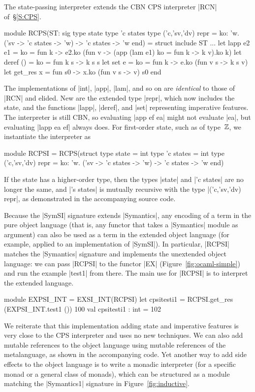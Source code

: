 The state-passing interpreter extends the CBN CPS
interpreter |RCN| of~\S\ref{S:CPS}.
\begin{code}
module RCPS(ST: sig 
  type state 
  type 'c states 
  type ('c,'sv,'dv) repr = 
      {ko: 'w. ('sv -> 'c states -> 'w) -> 'c states -> 'w}
end) = struct include ST ... 
  let lapp e2 e1 = {ko = fun k ->
      e2.ko (fun v -> (app (lam e1) {ko = fun k -> k v}).ko k)}
  let deref () = {ko = fun k s -> k s s}
  let set e = {ko = fun k -> e.ko (fun v s -> k s v)}
  let get_res x = fun s0 -> x.ko (fun v s -> v) s0
end
\end{code}
The implementations of |int|, |app|, |lam|, and so on are
\emph{identical} to those of |RCN| and elided. New are the extended type
|repr|,
which now includes the state, and the functions
|lapp|, |deref|, and |set| representing imperative features. The
interpreter is still CBN, so evaluating |app ef ea| might not
evaluate |ea|, but evaluating |lapp ea ef| always does.
For first-order state, such as of type~$\mathbb{Z}$, we 
instantiate the interpreter as
\begin{code}
module RCPSI = RCPS(struct 
  type state = int
  type 'c states = int
  type ('c,'sv,'dv) repr = 
      {ko: 'w. ('sv -> 'c states -> 'w) -> 'c states -> 'w}
end)
\end{code}
If the state has a higher-order type, then the types |state| and |'c states|
are no longer the same, and |'s states| is mutually
recursive with the type |('c,'sv,'dv) repr|, as demonstrated in the
accompanying source code.

Because the |SymSI| signature extends |Symantics|, any encoding of
a term in the pure object language (that is, any functor that takes
a |Symantics| module as argument) can also be used as a term in the
extended object language (for example, applied to an implementation of
|SymSI|).  In particular,
|RCPSI| matches the |Symantics| signature and implements the
unextended object language: we can pass |RCPSI|
to the functor |EX| (Figure~\ref{fig:ocaml-simple}) and run 
the example |test1| from there. The main use for |RCPSI| is to interpret the 
extended language.
\begin{code}
module EXPSI_INT = EXSI_INT(RCPSI)
let cpsitesti1 = RCPSI.get_res (EXPSI_INT.test1 ()) 100
val cpsitesti1 : int = 102
\end{code}

We reiterate that this implementation adding state and imperative
features is very close to the CPS interpreter and uses no new
techniques.
We can also add mutable references to the object language using
mutable references of the metalanguage, as shown in the accompanying
code.
Yet another way to add side effects to the object language is to
write a monadic interpreter (for a specific monad or a general
class of monads), which can be structured as a module matching the
|Symantics1| signature in Figure~\ref{fig:inductive}.
\fi
\fi

